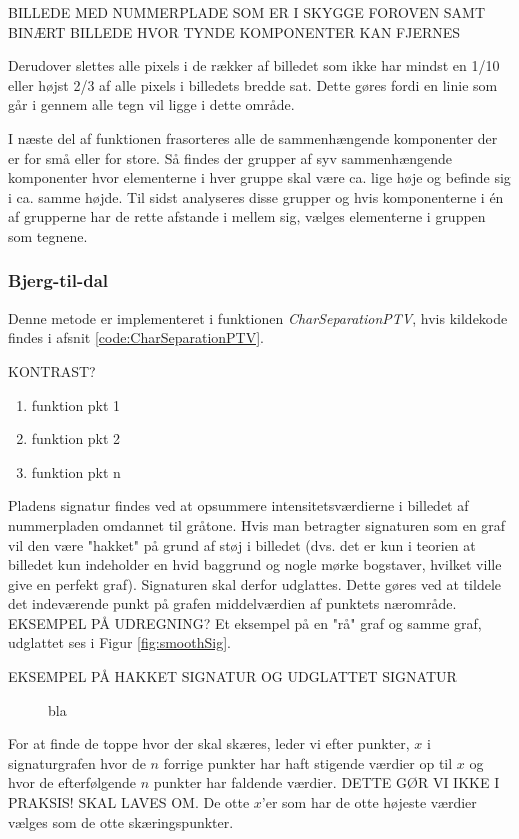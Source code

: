 BILLEDE MED NUMMERPLADE SOM ER I SKYGGE FOROVEN SAMT BINÆRT BILLEDE HVOR TYNDE KOMPONENTER KAN FJERNES

Derudover slettes alle pixels i de rækker af billedet som ikke har mindst en 1/10 eller højst 2/3 af alle pixels i billedets bredde sat. Dette gøres fordi en linie som går i gennem alle tegn vil ligge i dette område.

I næste del af funktionen frasorteres alle de sammenhængende komponenter der er for små eller for store. Så findes der grupper af syv sammenhængende komponenter hvor elementerne i hver gruppe skal være ca. lige høje og befinde sig i ca. samme højde. Til sidst analyseres disse grupper og hvis komponenterne i én af grupperne har de rette afstande i mellem sig, vælges elementerne i gruppen som tegnene.

\subsubsection*{Bjerg-til-dal}

Denne metode er implementeret i funktionen \textit{CharSeparationPTV}, hvis kildekode findes i afsnit \vref{code:CharSeparationPTV}.

KONTRAST?

\begin{enumerate}
\item funktion pkt 1
\item funktion pkt 2
\item funktion pkt n
\end{enumerate}

Pladens signatur findes ved at opsummere intensitetsværdierne i billedet af nummerpladen omdannet til gråtone. Hvis man betragter signaturen som en graf vil den være "hakket" på grund af støj i billedet (dvs. det er kun i teorien at billedet kun indeholder en hvid baggrund og nogle mørke bogstaver, hvilket ville give en perfekt graf). Signaturen skal derfor udglattes. Dette gøres ved at tildele det indeværende punkt på grafen middelværdien af punktets nærområde. EKSEMPEL PÅ UDREGNING? Et eksempel på en "rå" graf og samme graf, udglattet ses i Figur \vref{fig:smoothSig}.

EKSEMPEL PÅ HAKKET SIGNATUR OG UDGLATTET SIGNATUR

\begin{figure}[htp]
\label{fig:smoothSig}
\caption{bla}
\end{figure}

For at finde de toppe hvor der skal skæres, leder vi efter punkter, $x$ i signaturgrafen hvor de $n$ forrige punkter har haft stigende værdier op til $x$ og hvor de efterfølgende $n$ punkter har faldende værdier. DETTE GØR VI IKKE I PRAKSIS! SKAL LAVES OM. De otte $x$'er som har de otte højeste værdier vælges som de otte skæringspunkter.

